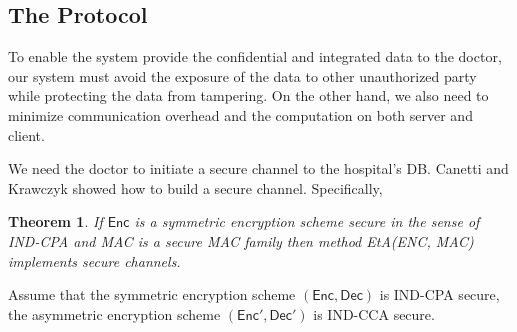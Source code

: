 \documentclass[11pt]{article}
\newcommand{\class}[1]{{\ensuremath{\mathsf{#1}}}}
\newcommand{\enc}{\class{Enc}}
\newcommand{\dec}{\class{Dec}}
\newtheorem{theorem}{Theorem}[section]
\begin{document}
\subsection{The Protocol}
To enable the system provide the confidential and integrated data to the doctor, our system must avoid the exposure of the data to other unauthorized party while protecting the data from tampering. On the other hand, we also need to minimize communication overhead and the computation on both server and client.

We need the doctor to initiate a secure channel to the hospital's DB. Canetti and Krawczyk \cite{DBLP:conf/eurocrypt/CanettiK01} showed how to build a secure channel. Specifically,
\begin{theorem}
If $\enc$ is a symmetric encryption scheme secure in the sense of IND-CPA and MAC is a secure MAC family then method EtA(ENC, MAC) implements secure channels.
\end{theorem}
Assume that the symmetric encryption scheme $(\enc, \dec)$ is IND-CPA secure, the asymmetric encryption scheme $(\enc', \dec')$ is IND-CCA secure.
\end{document}
